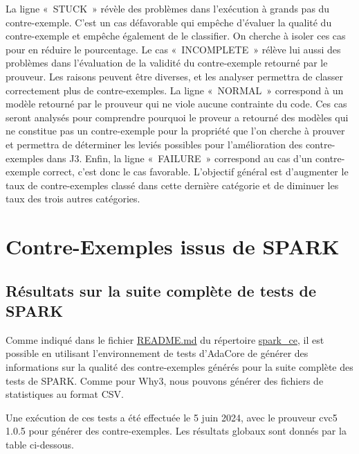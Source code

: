 \documentclass[a4paper,11pt]{article}
\begin{document}
La ligne «~STUCK~» révèle des problèmes dans l'exécution à grands pas du
contre-exemple. C'est un cas défavorable qui empêche d'évaluer la qualité
du contre-exemple et empêche également de le classifier.
On cherche à isoler ces cas pour en réduire le pourcentage.
Le cas «~INCOMPLETE~» rélève lui aussi des problèmes dans l'évaluation de
la validité du contre-exemple retourné par le prouveur. Les raisons
peuvent être diverses, et les analyser permettra de classer correctement plus
de contre-exemples.
La ligne «~NORMAL~» correspond à un modèle retourné par le prouveur qui ne
viole aucune contrainte du code. Ces cas seront analysés pour comprendre
pourquoi le proveur a retourné des modèles qui ne constitue pas un
contre-exemple pour la propriété que l'on cherche à prouver et permettra de
déterminer les leviés possibles pour l'amélioration des contre-exemples dans J3.
Enfin, la ligne «~FAILURE~» correspond au cas d'un contre-exemple correct, c'est
donc le cas favorable. L'objectif général est d'augmenter le taux
de contre-exemples classé dans cette dernière catégorie et de diminuer les
taux des trois autres catégories.

\section{Contre-Exemples issus de SPARK}

\subsection{Résultats sur la suite complète de tests de SPARK}

Comme indiqué dans le fichier \url{README.md} du répertoire \url{spark_ce}, il est
possible en utilisant l'environnement de tests d'AdaCore de générer des
informations sur la qualité des contre-exemples générés pour la suite complète
des tests de SPARK. Comme pour Why3, nous pouvons générer des fichiers de
statistiques au format CSV.

Une exécution de ces tests a été effectuée le 5 juin 2024, avec le prouveur cvc5
1.0.5 pour générer des contre-exemples. Les résultats globaux sont donnés par la
table ci-dessous.
\end{document}
